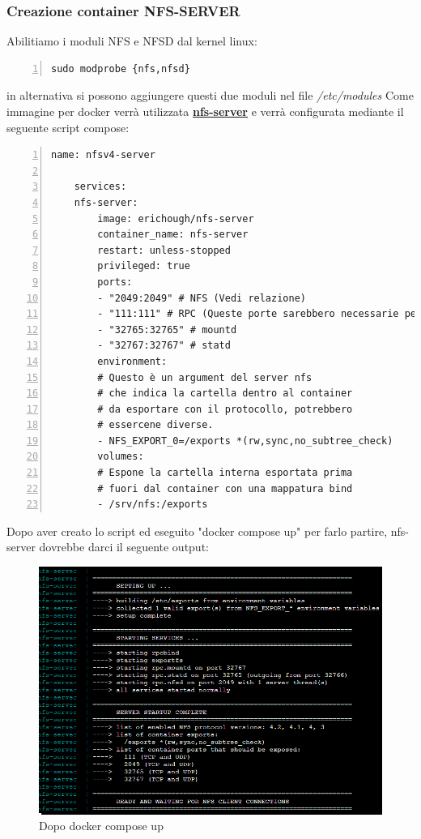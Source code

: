 \documentclass[a4paper]{article}
\begin{document}
\subsubsection{Creazione container NFS-SERVER}
Abilitiamo i moduli NFS e NFSD dal kernel linux:
\begin{Verbatim}[numbers=left,breaklines]
    sudo modprobe {nfs,nfsd}
\end{Verbatim}
in alternativa si possono aggiungere questi due moduli nel file \textit{/etc/modules}
Come immagine per docker verrà utilizzata \href{https://hub.docker.com/r/erichough/nfs-server/}{\textbf{nfs-server}}
e verrà configurata mediante il seguente script compose:
\begin{Verbatim}[numbers=left,breaklines]
    name: nfsv4-server

    services:
    nfs-server:
        image: erichough/nfs-server
        container_name: nfs-server
        restart: unless-stopped
        privileged: true
        ports:
        - "2049:2049" # NFS (Vedi relazione)
        - "111:111" # RPC (Queste porte sarebbero necessarie per supportare V3, non ci interessa per questo progetto)
        - "32765:32765" # mountd
        - "32767:32767" # statd
        environment:
        # Questo è un argument del server nfs
        # che indica la cartella dentro al container
        # da esportare con il protocollo, potrebbero
        # essercene diverse.
        - NFS_EXPORT_0=/exports *(rw,sync,no_subtree_check)
        volumes:
        # Espone la cartella interna esportata prima
        # fuori dal container con una mappatura bind
        - /srv/nfs:/exports
\end{Verbatim}
Dopo aver creato lo script ed eseguito "docker compose up" per farlo partire, nfs-server dovrebbe darci il seguente output:
\begin{figure}[H]
    \centering
    \includegraphics[scale=0.30]{images/NFSSettato.png}
    \caption{Dopo docker compose up}
\end{figure}
\end{document}
